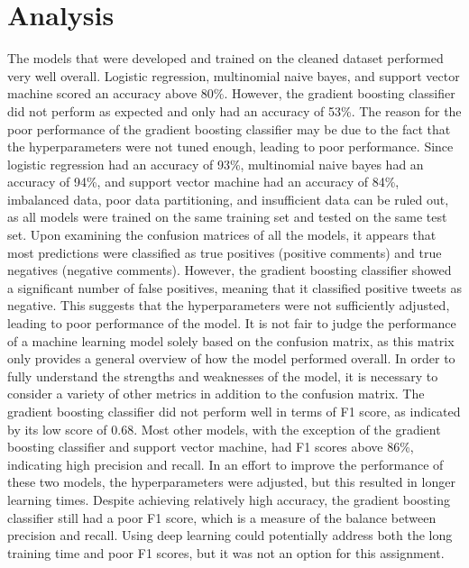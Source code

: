 \documentclass[conference]{IEEEtran}
\begin{document}
\section{Analysis}
The models that were developed and trained on the cleaned dataset performed very well overall. Logistic regression, multinomial naive bayes, and support vector machine scored an accuracy above 80\%. However, the gradient boosting classifier did not perform as expected and only had an accuracy of 53\%. The reason for the poor performance of the gradient boosting classifier may be due to the fact that the hyperparameters were not tuned enough, leading to poor performance. Since logistic regression had an accuracy of 93\%, multinomial naive bayes had an accuracy of 94\%, and support vector machine had an accuracy of 84\%, imbalanced data, poor data partitioning, and insufficient data can be ruled out, as all models were trained on the same training set and tested on the same test set.
\newline
\newline
Upon examining the confusion matrices of all the models, it appears that most predictions were classified as true positives (positive comments) and true negatives (negative comments). However, the gradient boosting classifier showed a significant number of false positives, meaning that it classified positive tweets as negative. This suggests that the hyperparameters were not sufficiently adjusted, leading to poor performance of the model. It is not fair to judge the performance of a machine learning model solely based on the confusion matrix, as this matrix only provides a general overview of how the model performed overall. In order to fully understand the strengths and weaknesses of the model, it is necessary to consider a variety of other metrics in addition to the confusion matrix.
\newline
\newline
The gradient boosting classifier did not perform well in terms of F1 score, as indicated by its low score of 0.68. Most other models, with the exception of the gradient boosting classifier and support vector machine, had F1 scores above 86\%, indicating high precision and recall. In an effort to improve the performance of these two models, the hyperparameters were adjusted, but this resulted in longer learning times. Despite achieving relatively high accuracy, the gradient boosting classifier still had a poor F1 score, which is a measure of the balance between precision and recall. Using deep learning could potentially address both the long training time and poor F1 scores, but it was not an option for this assignment.
\end{document}
